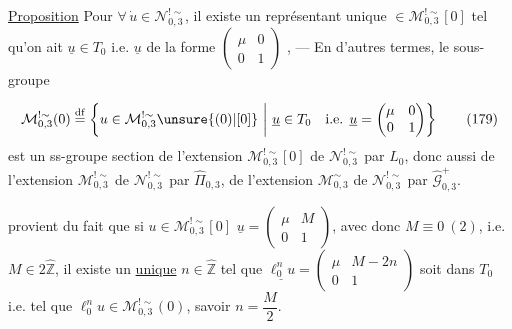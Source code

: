 \uline{Proposition} Pour $\forall\,\dot u\in\mathcal N_{0,3}^{!\sim}$, il existe un représentant unique  $\in\mathcal M_{0,3}^{!\sim}[0]$ tel qu'on ait $\underline u\in T_0$ i.e. $\underline u$ de la forme $\begin{pmatrix}\mu&0\\0&1\end{pmatrix}$
\inserted{[i.e. $\xi=\begin{pmatrix}A&B\\C&D\end{pmatrix}$ de la forme $\begin{pmatrix}A&0\\C&D\end{pmatrix}=\begin{pmatrix}\unsure{\frac{1}{D}}&0\\1-D&D\end{pmatrix}$]}, --- En d'autres termes, le sous-groupe


\[
\mathcal M_{0,3}^{!\sim}(0)\overset{\mathrm{df}}=
\left\{u\in\mathcal M_{0,3}^{!\sim}\unsure{(0)|[0]}\ \middle|\ \underline u\in T_0\quad\text{i.e. }\underline u=\begin{pmatrix}\mu&0\\0&1\end{pmatrix}\right\}
\tag{179}
\]
est un ss-groupe section de l'extension $\mathcal M_{0,3}^{!\sim}[0]$ de $\mathcal N_{0,3}^{!\sim}$ par $L_0$, donc aussi de l'extension $\mathcal M_{0,3}^{!\sim}$ de $\mathcal N_{0,3}^{!\sim}$ par $\widehat\Pi_{0,3}$,  de l'extension $\mathcal M_{0,3}^{\sim}$ de $\mathcal N_{0,3}^{!\sim}$ par $\widehat{\mathcal G}_{0,3}^{+}$.

 provient du fait que si $u\in\mathcal M_{0,3}^{!\sim}[0]$  $\underline u=\begin{pmatrix}\mu&M\\0&1\end{pmatrix}$, avec donc $M\equiv0\ (2)$, i.e. $M\in2\widehat{\mathbb Z}$, il existe un \uline{unique} $n\in\widehat{\mathbb Z}$ tel que $\underline{\ell_0^n u}=\begin{pmatrix}\mu&M-2n\\0&1\end{pmatrix}$ soit dans $T_0$ i.e. tel que $\ell_0^n u\in\mathcal M_{0,3}^{!\sim}(0)$, savoir $n=\dfrac M2$.

